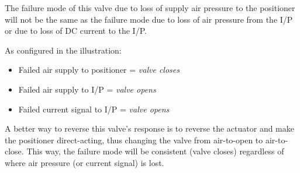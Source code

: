 





The failure mode of this valve due to loss of supply air pressure to the positioner will not be the same as the failure mode due to loss of air pressure from the I/P or due to loss of DC current to the I/P.
 






As configured in the illustration:

\begin{itemize}
\item{} Failed air supply to positioner = {\it valve closes}
\item{} Failed air supply to I/P = {\it valve opens}
\item{} Failed current signal to I/P = {\it valve opens}
\end{itemize}

\vskip 10pt

A better way to reverse this valve's response is to reverse the actuator and make the positioner direct-acting, thus changing the valve from air-to-open to air-to-close.  This way, the failure mode will be consistent (valve closes) regardless of where air pressure (or current signal) is lost.




